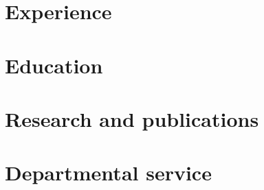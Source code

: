 \documentclass[11pt]{moderncv}
\begin{document}
\maketitle

\section{Experience}

\section{Education}

\section{Research and publications}

\section{Departmental service}
\end{document}
